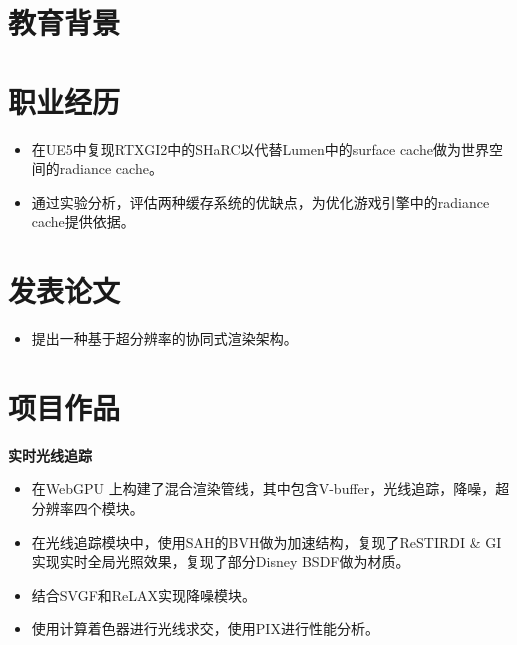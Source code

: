 \documentclass{resume}
\begin{document}



\section{教育背景}
\vspace{12pt}
\section{职业经历}
\begin{itemize}
  \item 在UE5中复现RTXGI2中的SHaRC以代替Lumen中的surface cache做为世界空间的radiance cache。
  \item 通过实验分析，评估两种缓存系统的优缺点，为优化游戏引擎中的radiance cache提供依据。
\end{itemize}
\section{发表论文}
\begin{itemize}
  \item 提出一种基于超分辨率的协同式渲染架构。
\end{itemize}

\section{项目作品}
\textbf{实时光线追踪}
\begin{itemize}
  \item 在WebGPU 上构建了混合渲染管线，其中包含V-buffer，光线追踪，降噪，超分辨率四个模块。
  \item 在光线追踪模块中，使用SAH的BVH做为加速结构，复现了ReSTIRDI \& GI 实现实时全局光照效果，复现了部分Disney BSDF做为材质。
  \item 结合SVGF和ReLAX实现降噪模块。
  \item 使用计算着色器进行光线求交，使用PIX进行性能分析。
\end{itemize}
\end{document}
